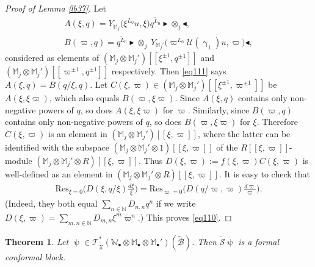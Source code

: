 \documentclass[12pt,b5paper,notitlepage]{report}
\theoremstyle{definition}
\theoremstyle{plain}
\newtheorem{thm}[df]{Theorem}
\newcommand{\fk}{\mathfrak}
\newcommand{\mc}{\mathcal}
\newcommand{\wtd}{\widetilde}
\newcommand{\Res}{\mathrm{Res}}
\newcommand{\scr}{\mathscr}
\newcommand{\blt}{\bullet}
\newcommand{\Wbb}{\mathbb W}
\newcommand{\Mbb}{\mathbb M}
\newcommand{\Nbb}{\mathbb N}
\newcommand{\btl}{\blacktriangleleft}
\newcommand{\btr}{\blacktriangleright}
\numberwithin{equation}{section}
\begin{document}
\begin{proof}[Proof of Lemma \ref{lb37}]
Let 
\begin{gather*}
A(\xi,q)=Y_{\Mbb_j}\big(\xi^{L_0}u,\xi\big)q^{\wtd L_0}\btr\otimes_j\btl,\\
B(\varpi,q)=q^{\wtd L_0}\btr\otimes_j~Y_{\Mbb_j'}\big(\varpi^{L_0}\mc U(\upgamma_1)u,\varpi\big)\btl,
\end{gather*}
considered as elements of $(\Mbb_j\otimes\Mbb_j')[[\xi^{\pm1},q^{\pm 1}]]$ and $(\Mbb_j\otimes\Mbb_j')[[\varpi^{\pm1},q^{\pm 1}]]$ respectively. Then \eqref{eq111} says $A(\xi,q)=B(q/\xi,q)$. Let $C(\xi,\varpi)\in(\Mbb_j\otimes\Mbb_j')[[\xi^{\pm 1},\varpi^{\pm1}]]$  be $A(\xi,\xi\varpi)$, which also equals $B(\varpi,\xi\varpi)$. Since $A(\xi,q)$ contains only non-negative  powers of $q$, so does $A(\xi,\xi\varpi)$ for $\varpi$.   Similarly, since $B(\varpi,q)$ contains only non-negative powers of $q$, so does $B(\varpi,\xi\varpi)$ for $\xi$. Therefore $C(\xi,\varpi)$ is an element in  $(\Mbb_j\otimes\Mbb_j')[[\xi,\varpi]]$, where the latter  can be identified with the subspace $(\Mbb_j\otimes\Mbb_j'\otimes 1)[[\xi,\varpi]]$ of the $R[[\xi,\varpi]]$-module $(\Mbb_j\otimes\Mbb_j'\otimes R)[[\xi,\varpi]]$. Thus $D(\xi,\varpi):=f(\xi,\varpi)C(\xi,\varpi)$ is well-defined as an element in $(\Mbb_j\otimes\Mbb_j'\otimes R)[[\xi,\varpi]]$. It is easy to check that
\begin{align*}
\Res_{\xi=0}\bigg(D(\xi,q/\xi)\frac{d\xi}{\xi}\bigg)=\Res_{\varpi=0}\bigg(D(q/\varpi,\varpi)\frac{d\varpi}{\varpi}\bigg).
\end{align*}
(Indeed, they both equal $\sum_{n\in\Nbb}D_{n,n}q^n$ if we write $D(\xi,\varpi)=\sum_{m,n\in\Nbb}D_{m,n}\xi^m\varpi^n$.) This proves \eqref{eq110}.
\end{proof}



\begin{thm}\label{lb42}
Let $\uppsi\in\scr T_{\wtd{\fk X}}^*(\Wbb_\blt\otimes\Mbb_\blt\otimes\Mbb_\blt')(\wtd{\mc B})$. Then $\wtd{\mc S}\uppsi$ is a formal conformal block.
\end{thm}
\end{document}
